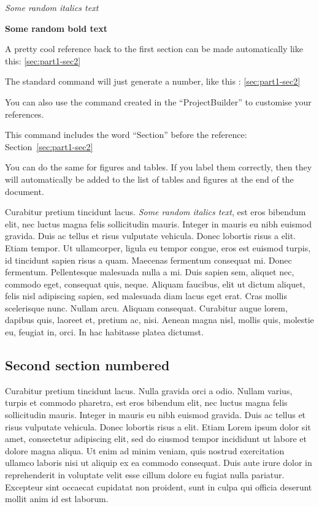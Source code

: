 \documentclass[10pt,twoside]{article}
\begin{document}
\emph{Some random italics text}

\textbf{Some random bold text}

A pretty cool reference back to the first section can be made
automatically like this: \ref{sec:part1-sec2}

The standard command will just generate a number, like this :
\ref{sec:part1-sec2}

You can also use the command created in the ``ProjectBuilder'' to
customise your references.

This command includes the word ``Section'' before the reference:
Section~\ref{sec:part1-sec2}

You can do the same for figures and tables. If you label them correctly,
then they will automatically be added to the list of tables and figures
at the end of the document.

Curabitur pretium tincidunt lacus. \emph{Some random italics text}, est
eros bibendum elit, nec luctus magna felis sollicitudin mauris. Integer
in mauris eu nibh euismod gravida. Duis ac tellus et risus vulputate
vehicula. Donec lobortis risus a elit. Etiam tempor. Ut ullamcorper,
ligula eu tempor congue, eros est euismod turpis, id tincidunt sapien
risus a quam. Maecenas fermentum consequat mi. Donec fermentum.
Pellentesque malesuada nulla a mi. Duis sapien sem, aliquet nec, commodo
eget, consequat quis, neque. Aliquam faucibus, elit ut dictum aliquet,
felis nisl adipiscing sapien, sed malesuada diam lacus eget erat. Cras
mollis scelerisque nunc. Nullam arcu. Aliquam consequat. Curabitur augue
lorem, dapibus quis, laoreet et, pretium ac, nisi. Aenean magna nisl,
mollis quis, molestie eu, feugiat in, orci. In hac habitasse platea
dictumst.

\hypertarget{sec:part2-sec2}{%
\subsection{Second section numbered}\label{sec:part2-sec2}}

Curabitur pretium tincidunt lacus. Nulla gravida orci a odio. Nullam
varius, turpis et commodo pharetra, est eros bibendum elit, nec luctus
magna felis sollicitudin mauris. Integer in mauris eu nibh euismod
gravida. Duis ac tellus et risus vulputate vehicula. Donec lobortis
risus a elit. Etiam Lorem ipsum dolor sit amet, consectetur adipiscing
elit, sed do eiusmod tempor incididunt ut labore et dolore magna aliqua.
Ut enim ad minim veniam, quis nostrud exercitation ullamco laboris nisi
ut aliquip ex ea commodo consequat. Duis aute irure dolor in
reprehenderit in voluptate velit esse cillum dolore eu fugiat nulla
pariatur. Excepteur sint occaecat cupidatat non proident, sunt in culpa
qui officia deserunt mollit anim id est laborum.
\end{document}
